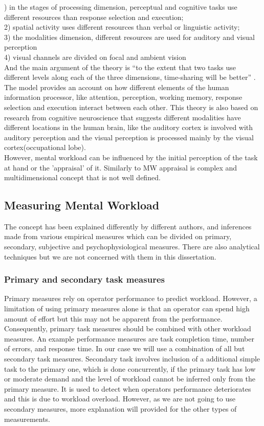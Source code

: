 \documentclass[a4paper]{report}
\begin{document}
			) in the stages of processing dimension, perceptual and cognitive tasks use different resources than response selection and execution;\\
			2) spatial activity uses different resources than verbal or linguistic activity;\\
			3) the modalities dimension, different resources are used for auditory and visual perception\\
			4) visual channels are divided on focal and ambient vision\\
			And the main argument of the theory is ``to the extent that two tasks use different levels along each of the three dimensions, time-sharing will be better'' \cite{wickens2008multiple}. The model provides an account on how different elements of the human information processor, like attention, perception, working memory, response selection and execution interact between each other. This theory is also based on research from cognitive neuroscience that suggests  different modalities have different locations in the human brain, like the auditory cortex is involved with auditory perception and the visual perception is processed mainly by the visual cortex(occupational lobe).\\

			However, mental workload can be influenced by the initial perception of the task at hand or the 'appraisal' of it. Similarly to MW appraisal is complex and multidimensional concept\cite{folkman1986dynamics,peacock1990stress} that is not well defined.
		
			\subsection{Measuring Mental Workload}
			The concept has been explained differently by different authors, and inferences made from various empirical measures which can be divided on primary, secondary, subjective and psychophysiological measures. There are also analytical techniques but we are not concerned with them in this dissertation.
				\subsubsection{Primary and secondary task measures}
				Primary measures rely on operator performance to predict workload. However, a limitation of using primary measures alone is that an operator can spend high amount of effort but this may not be apparent from the performance\cite{wilson2015evaluation}. Consequently, primary task measures should be combined with other workload measures. An example performance measures are task completion time, number of errors, and response time. In our case we will use a combination of all but secondary task measures. Secondary task involves inclusion of a additional simple task to the primary one, which is done concurrently, if the primary task has low or moderate demand and the level of workload cannot be inferred only from the primary measure. It is used to detect when operators performance deteriorates and this is due to workload overload. However, as we are not going to use secondary measures, more explanation will provided for the other types of measurements.
\end{document}
